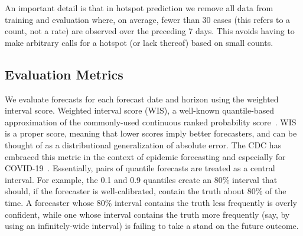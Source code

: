 \documentclass[9pt,twocolumn,twoside,lineno]{pnas-new}
\begin{document}
An important detail is that in hotspot prediction we remove all data from
training and evaluation where, on average, fewer than 30 cases (this refers to a
count, not a rate) are observed over the preceding 7 days. This avoids having to
make arbitrary calls for a hotspot (or lack thereof) based on small counts.   

\subsection{Evaluation Metrics}

We evaluate forecasts for each forecast date and horizon using the weighted
interval score. Weighted interval score (WIS), a well-known quantile-based
approximation of the commonly-used continuous ranked probability
score~\cite{gneiting-proper-score}. WIS is a proper score, meaning that lower
scores imply better forecasters, and can be thought of as a distributional
generalization of absolute error. The CDC has embraced this metric in the
context of epidemic forecasting and especially for COVID-19~\cite{wis-paper}.
Essentially, pairs of quantile forecasts are treated as a central  interval. For
example, the 0.1 and 0.9 quantiles create an 80\% interval that should, if the
forecaster is well-calibrated, contain the truth about 80\% of the time. A
forecaster whose 80\% interval contains the truth less frequently is overly
confident, while one whose interval contains the truth more frequently (say, by
using an infinitely-wide interval) is failing to take a stand on the future
outcome.  
\end{document}
